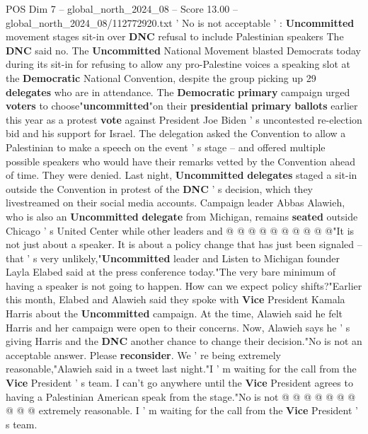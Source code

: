 \begin{textsample}{POS Dim 7 – global\_north\_2024\_08 – Score 13.00 – global\_north\_2024\_08/112772920.txt}  \label{ex:f7_pos_012}
' No is not acceptable ' : \textbf{Uncommitted} movement stages sit-in over \textbf{DNC} refusal to include Palestinian speakers The \textbf{DNC} said no.
The \textbf{Uncommitted} National Movement blasted Democrats today during its sit-in for refusing to allow any pro-Palestine voices a speaking slot at the \textbf{Democratic} National Convention, despite the group picking up 29 \textbf{delegates} who are in attendance.
The \textbf{Democratic} \textbf{primary} campaign urged \textbf{voters} to choose"\textbf{uncommitted}"on their \textbf{presidential} \textbf{primary} \textbf{ballots} earlier this year as a protest \textbf{vote} against President Joe Biden ' s uncontested re-election bid and his support for Israel.
The delegation asked the Convention to allow a Palestinian to make a speech on the event ' s stage -- and offered multiple possible speakers who would have their remarks vetted by the Convention ahead of time.
They were denied.
Last night, \textbf{Uncommitted} \textbf{delegates} staged a sit-in outside the Convention in protest of the \textbf{DNC} ' s decision, which they livestreamed on their social media accounts.
Campaign leader Abbas Alawieh, who is also an \textbf{Uncommitted} \textbf{delegate} from Michigan, remains \textbf{seated} outside Chicago ' s United Center while other leaders and @ @ @ @ @ @ @ @ @ @"It is not just about a speaker.
It is about a policy change that has just been signaled -- that ' s very unlikely,"\textbf{Uncommitted} leader and Listen to Michigan founder Layla Elabed said at the press conference today."The very bare minimum of having a speaker is not going to happen.
How can we expect policy shifts?"Earlier this month, Elabed and Alawieh said they spoke with \textbf{Vice} President Kamala Harris about the \textbf{Uncommitted} campaign.
At the time, Alawieh said he felt Harris and her campaign were open to their concerns.
Now, Alawieh says he ' s giving Harris and the \textbf{DNC} another chance to change their decision."No is not an acceptable answer.
Please \textbf{reconsider}.
We ' re being extremely reasonable,"Alawieh said in a tweet last night."I ' m waiting for the call from the \textbf{Vice} President ' s team.
I can't go anywhere until the \textbf{Vice} President agrees to having a Palestinian American speak from the stage."No is not @ @ @ @ @ @ @ @ @ @ extremely reasonable.
I ' m waiting for the call from the \textbf{Vice} President ' s team.

\end{textsample}
